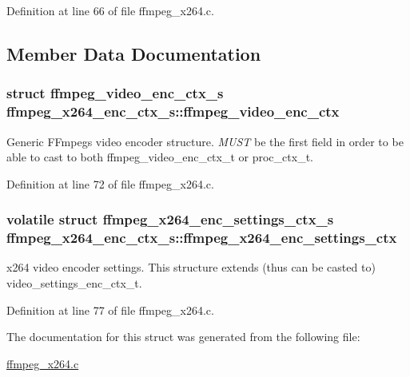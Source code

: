 Definition at line 66 of file ffmpeg\+\_\+x264.\+c.



\subsection{Member Data Documentation}
\subsubsection[{\texorpdfstring{ffmpeg\+\_\+video\+\_\+enc\+\_\+ctx}{ffmpeg_video_enc_ctx}}]{\setlength{\rightskip}{0pt plus 5cm}struct {\bf ffmpeg\+\_\+video\+\_\+enc\+\_\+ctx\+\_\+s} ffmpeg\+\_\+x264\+\_\+enc\+\_\+ctx\+\_\+s\+::ffmpeg\+\_\+video\+\_\+enc\+\_\+ctx}\hypertarget{structffmpeg__x264__enc__ctx__s_a782710a2e5a3ff63716885b491ba05dd}{}\label{structffmpeg__x264__enc__ctx__s_a782710a2e5a3ff63716885b491ba05dd}
Generic F\+Fmpeg\textquotesingle{}s video encoder structure. {\itshape M\+U\+ST} be the first field in order to be able to cast to both ffmpeg\+\_\+video\+\_\+enc\+\_\+ctx\+\_\+t or proc\+\_\+ctx\+\_\+t. 

Definition at line 72 of file ffmpeg\+\_\+x264.\+c.

\subsubsection[{\texorpdfstring{ffmpeg\+\_\+x264\+\_\+enc\+\_\+settings\+\_\+ctx}{ffmpeg_x264_enc_settings_ctx}}]{\setlength{\rightskip}{0pt plus 5cm}volatile struct {\bf ffmpeg\+\_\+x264\+\_\+enc\+\_\+settings\+\_\+ctx\+\_\+s} ffmpeg\+\_\+x264\+\_\+enc\+\_\+ctx\+\_\+s\+::ffmpeg\+\_\+x264\+\_\+enc\+\_\+settings\+\_\+ctx}\hypertarget{structffmpeg__x264__enc__ctx__s_a6d22abf4f30d02f8bb4b809579595e83}{}\label{structffmpeg__x264__enc__ctx__s_a6d22abf4f30d02f8bb4b809579595e83}
x264 video encoder settings. This structure extends (thus can be casted to) video\+\_\+settings\+\_\+enc\+\_\+ctx\+\_\+t. 

Definition at line 77 of file ffmpeg\+\_\+x264.\+c.



The documentation for this struct was generated from the following file\+:\begin{DoxyCompactItemize}
\item 
\hyperlink{ffmpeg__x264_8c}{ffmpeg\+\_\+x264.\+c}\end{DoxyCompactItemize}
